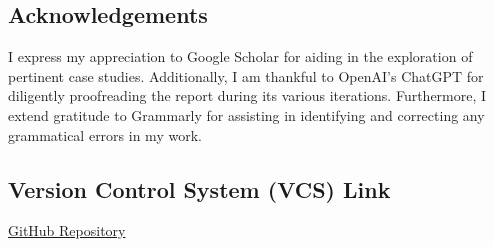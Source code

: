 \documentclass{article}
\begin{document}
\subsection{Acknowledgements}
I express my appreciation to Google Scholar for aiding in the exploration of pertinent case studies. Additionally, I am thankful to OpenAI's ChatGPT for diligently proofreading the report during its various iterations. Furthermore, I extend gratitude to Grammarly for assisting in identifying and correcting any grammatical errors in my work.

\subsection{Version Control System (VCS) Link}
\href{https://github.com/konark2010/SOEN-6841-TAS}{GitHub Repository}
\end{document}
